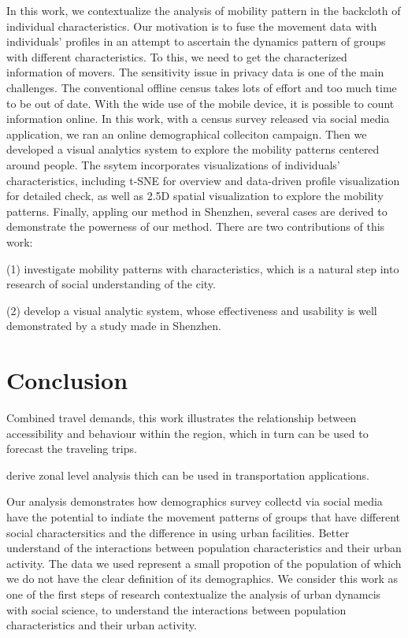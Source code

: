 \documentclass{vgtc}                          %
\begin{document}
In this work, we contextualize the analysis of mobility pattern in the backcloth of individual characteristics. Our motivation is to fuse the movement data with individuals' profiles in an attempt to ascertain the dynamics pattern of groups with different characteristics. To this, we need to get the characterized information of movers. The sensitivity issue in privacy data is one of the main challenges. The conventional offline census takes lots of effort and too much time to be out of date. With the wide use of the mobile device, it is possible to count information online. In this work, with a census survey released via social media application, we ran an online demographical colleciton campaign. Then we developed a visual analytics system to explore the mobility patterns centered around people. The ssytem incorporates visualizations of individuals' characteristics, including t-SNE for overview and data-driven profile visualization for detailed check, as well as 2.5D spatial visualization to explore the mobility patterns. Finally, appling our method in Shenzhen, several cases are derived to demonstrate the powerness of our method. There are two contributions of this work: 

(1) investigate mobility patterns with characteristics, which is a natural step into research of social understanding of the city. 

(2) develop a visual analytic system, whose effectiveness and usability is well demonstrated by a study made in Shenzhen.



% 

% 
% 

\section{Conclusion}
\label{sec:conclusion}

Combined travel demands, this work illustrates the relationship between accessibility and behaviour within the region, which in turn can be used to forecast the traveling trips. 

derive zonal level analysis thich can be used in transportation applications.

Our analysis demonstrates how demographics survey collectd via social media have the potential to indiate the movement patterns of groups that have different social charactersitics and the difference in using urban facilities. Better understand of the interactions between population characteristics and their urban activity. The data we used represent a small propotion of the population of which we do not have the clear definition of its demographics. We consider this work as one of the first steps of research contextualize the analysis of urban dynamcis with social science, to understand the  interactions between population characteristics and their urban activity. 



\end{document}
